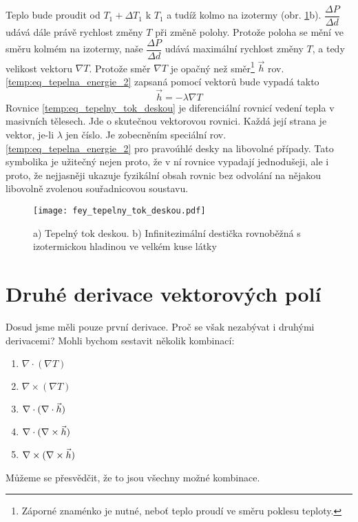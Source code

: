     Teplo bude proudit od $T_1+\Delta T_1$ k $T_1$ a tudíž kolmo na izotermy (obr. 
    \ref{fyz:fig_tok_deskou}b). $\dfrac{\Delta P}{\Delta d}$ udává dále právě rychlost změny $T$ při změně 
    polohy. Protože poloha se mění ve směru kolmém na izotermy, naše $\dfrac{\Delta P}{\Delta d}$ udává 
    maximální rychlost změny $T$, a tedy velikost vektoru $\nabla T$. Protože směr $\nabla T$ je opačný než 
    směr\footnote{Záporné znaménko je nutné, neboť teplo proudí ve  směru poklesu teploty.} $\vec{h}$  rov. 
    \ref{temp:eq_tepelna_energie_2} zapsaná pomocí vektorů bude vypadá takto
    \begin{equation}\label{temp:eq_tepelny_tok_deskou}
      \vec{h}=-\lambda\nabla T
    \end{equation}
    Rovnice \ref{temp:eq_tepelny_tok_deskou} je diferenciální rovnicí vedení tepla v masivních tělesech. 
    Jde o skutečnou vektorovou rovnici. Každá její strana je vektor, je-li $\lambda$ jen číslo. Je 
    zobecněním speciální rov. \ref{temp:eq_tepelna_energie_2} pro pravoúhlé desky na libovolné případy. 
    Tato symbolika je užitečný nejen proto, že v ní rovnice vypadají jednodušeji, ale i proto, že 
    nejjasněji ukazuje fyzikální obsah rovnic bez odvolání na nějakou libovolně zvolenou souřadnicovou 
    soustavu.      
    
    \begin{figure}
      \texttt{[image: fey\_tepelny\_tok\_deskou.pdf]}
      \caption{a) Tepelný tok deskou. b) Infinitezimální destička rovnoběžná s izotermickou hladinou ve 
               velkém kuse látky}
      \label{fyz:fig_tok_deskou}    
    \end{figure}
 
  \section{Druhé derivace vektorových polí}\label{sec:fey_diff_2deriv}
    \cite[s.~39]{Feynman02} Dosud jsme měli pouze první derivace. Proč se však nezabývat i druhými
    derivacemi? Mohli bychom sestavit několik kombinací:
    \begin{enumerate}[leftmargin=2cm,rightmargin=2cm, label=\emph{\alph*})]
      \setlength{\itemsep}{0cm}%
      \setlength{\parskip}{0em}%
      \item $\nabla\cdot(\nabla T)$
      \item $\nabla\times(\nabla T)$
      \item $\nabla\cdot(\nabla\cdot\vec{h})$
      \item $\nabla\cdot(\nabla\times\vec{h})$
      \item $\nabla\times(\nabla\times\vec{h})$
    \end{enumerate}
    Můžeme se přesvědčit, že to jsou všechny možné kombinace.
  
